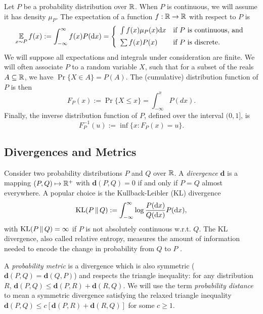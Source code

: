 \documentclass{article}
\def \dive {\mathbf{d}}
\def \dx {\textrm{d} x}
\begin{document}
Let $P$ be a probability distribution over $\mathbb{R}$. When $P$ is continuous, we will assume it has density $\mu_P$. The expectation of a function $f : \mathbb{R} \to \mathbb{R}$ with respect to $P$ is
\begin{equation*}
\expect_{x \sim P} f(x) := \int_{-\infty}^\infty f(x) P(\dx) = \left \{
\begin{array}{ll}
\int f(x) \mu_P(x) \dx & \text{if $P$ is continuous, and} \vspace{0.5em}\\
\sum f(x) P(x) & \text{if $P$ is discrete}.
\end{array} \right .
\end{equation*}
We will suppose all expectations and integrals under consideration are finite. We will often associate $P$ to a random variable $X$, such that for a subset of the reals $A \subseteq \mathbb{R}$, we have $\Pr \{ X \in A \} = P(A)$. The (cumulative) distribution function of $P$ is then
\begin{equation*}
F_P(x) := \Pr \{ X \le x \} = \int_{-\infty}^x P(dx) .
\end{equation*}
Finally, the inverse distribution function of $P$, defined over the interval $(0, 1]$, is
\begin{equation*}
F^{-1}_P(u) := \inf \{ x : F_P(x) = u \}.
\end{equation*}
\subsection{Divergences and Metrics}

Consider two probability distributions $P$ and $Q$ over $\mathbb{R}$. A \emph{divergence} $\dive$ is a mapping $(P, Q) \mapsto \mathbb{R}^+$ with $\dive(P, Q) = 0$ if and only if $P = Q$ almost everywhere. A popular choice is the Kullback-Leibler (KL) divergence
\begin{equation*}
\KL(P \cdbar Q) := \int_{-\infty}^\infty \log \frac{P(\dx)}{Q(\dx)} P(\dx),
\end{equation*}
with $\textrm{KL}(P \, \| \, Q) = \infty$ if $P$ is not absolutely continuous w.r.t. $Q$. The KL divergence, also called relative entropy, measures the amount of information needed to encode the  change in probability from $Q$ to $P$ \citep{cover91elements}.

A \emph{probability metric} is a divergence which is also symmetric ($\dive(P, Q) = \dive(Q, P)$) and respects the triangle inequality: for any distribution $R$, $\dive(P, Q) \le \dive(P, R) + \dive(R, Q)$. We will use the term \emph{probability distance} to mean a symmetric divergence satisfying the relaxed triangle inequality $\dive(P, Q) \le c \left [ \dive(P, R) + \dive(R, Q) \right ]$ for some $c \ge 1$.
%
%
\end{document}
